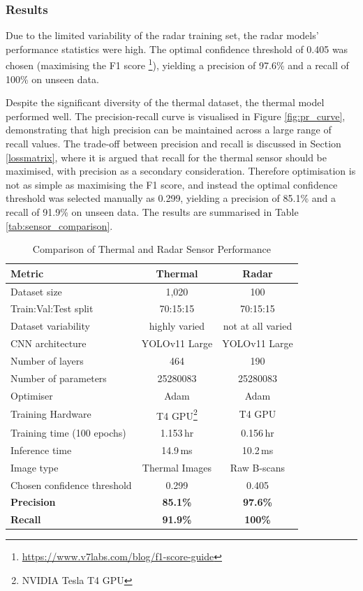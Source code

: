 \subsubsection{Results} \label{sec:cv_results_comparison}

Due to the limited variability of the radar training set, the radar models' performance statistics were high. The optimal confidence threshold of 0.405 was chosen (maximising the F1 score \footnote{\url{https://www.v7labs.com/blog/f1-score-guide}}), yielding a precision of 97.6\% and a recall of 100\% on unseen data.

Despite the significant diversity of the thermal dataset, the thermal model performed well. The precision-recall curve is visualised in Figure \ref{fig:pr_curve}, demonstrating that high precision can be maintained across a large range of recall values. The trade-off between precision and recall is discussed in Section \ref{lossmatrix}, where it is argued that recall for the thermal sensor should be maximised, with precision as a secondary consideration. Therefore optimisation is not as simple as maximising the F1 score, and instead the optimal confidence threshold was selected manually as 0.299, yielding a precision of 85.1\% and a recall of 91.9\% on unseen data. The results are summarised in Table \ref{tab:sensor_comparison}.

\begin{table}[htbp]
\centering

\label{tab:sensor_comparison}
\begin{tabular}{lcc}
\hline
\textbf{Metric} & \textbf{Thermal} & \textbf{Radar} \\ 
\hline
Dataset size & 1,020 & 100 \\
Train:Val:Test split & 70:15:15 & 70:15:15 \\
Dataset variability & highly varied & not at all varied \\
CNN architecture & YOLOv11 Large & YOLOv11 Large \\
Number of layers & 464 & 190 \\
Number of parameters & 25280083 & 25280083 \\
Optimiser & Adam & Adam \\
Training Hardware & T4 GPU\footnote{\label{ftn:t4gpu}NVIDIA Tesla T4 GPU} & T4 GPU\\
Training time (100 epochs) & 1.153\,hr & 0.156\,hr \\
Inference time & 14.9\,ms & 10.2\,ms \\
Image type & Thermal Images & Raw B-scans \\
Chosen confidence threshold & 0.299 & 0.405 \\
\hline
\rowcolor{gray!10} \textbf{Precision} & \textbf{85.1\%} & \textbf{97.6\%} \\
\rowcolor{gray!10} \textbf{Recall} & \textbf{91.9\%} & \textbf{100\%} \\
\hline
\end{tabular}
\caption{Comparison of Thermal and Radar Sensor Performance}
\end{table}


